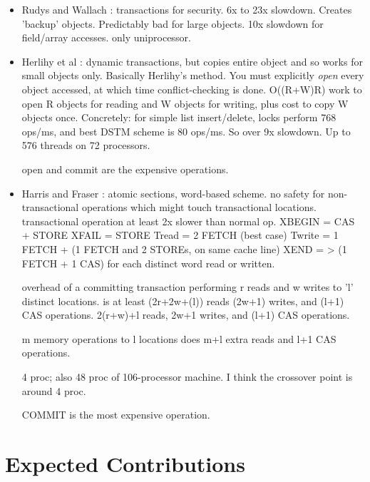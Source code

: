 \documentclass[12pt]{article}
\begin{document}
{\begin{itemize}
  64 processors; no numbers presented for less than 10 processors.

  acquire/release/agree are expensive.

\item Rudys and Wallach \cite{RudysWa02}: transactions for security.
  6x to 23x slowdown.  Creates 'backup' objects.  Predictably bad
  for large objects.  10x slowdown for field/array accesses.
  only uniprocessor.

\item Herlihy et al \cite{HerlihyLuMoSc03}: dynamic transactions, but
  copies entire object and so works for small objects only.  Basically
  Herlihy's method.  You must explicitly \emph{open} every object
  accessed, at which time conflict-checking is done.
  O((R+W)R) work to open R objects for reading and W objects for
  writing, plus cost to copy W objects once.  Concretely: for simple
  list insert/delete, locks perform 768 ops/ms, and best DSTM scheme
  is 80 ops/ms.   So over 9x slowdown.
  Up to 576 threads on 72 processors.

  open and commit are the expensive operations.
\item Harris and Fraser \cite{HarrisFr03}: atomic sections, word-based
  scheme.  no safety for non-transactional operations which might
  touch transactional locations.  transactional operation at least 2x
  slower than normal op.
  XBEGIN = CAS + STORE
  XFAIL = STORE
  Tread = 2 FETCH (best case)
  Twrite = 1 FETCH + (1 FETCH and 2 STOREs, on same cache line)
  XEND = > (1 FETCH + 1 CAS) for each distinct word read or written.

  overhead of a committing transaction performing r reads and w writes
  to 'l' distinct locations.
  is at least (2r+2w+(l)) reads (2w+1) writes, and (l+1) CAS
  operations.  2(r+w)+l reads, 2w+1 writes, and (l+1) CAS operations.

m memory operations to l locations does m+l extra reads and l+1 CAS operations.

  4 proc; also 48 proc of 106-processor machine.  I think the
  crossover point is around 4 proc.

  COMMIT is the most expensive operation.
\end{itemize}
}


\section{Expected Contributions}
\end{document}

